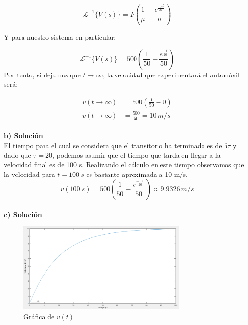 \documentclass[12pt, letterpaper]{article}
\begin{document}
\begin{equation}	
		\mathscr{L}^{-1} \{V(s)\} = F \left( \frac{1}{\mu} - \frac{e^{\frac{-\mu t}{M}}}{\mu}\right)
\end{equation}

Y para nuestro sistema en particular:

\begin{equation}	
		\mathscr{L}^{-1} \{V(s)\} = 500 \left( \frac{1}{50} - \frac{e^{\frac{-t}{20}}}{50}\right)
\end{equation}
Por tanto, si dejamos que $t \rightarrow \infty$, la velocidad que experimentará el automóvil será:

\begin{equation}
	\boxed{\begin{split}
		v(t \rightarrow \infty) &= 500 \left( \frac{1}{50} - 0\right)\\
		v(t \rightarrow \infty) & = \frac{500}{50} = 10\ m/s
	\end{split}}
\end{equation}\\
\textbf{b) Solución}\\
El tiempo para el cual se considera que el transitorio ha terminado es de $5\tau$ y dado que $\tau = 20$, podemos asumir que el tiempo que tarda en llegar a la velocidad final es de 100 s. Realizando el cálculo en este tiempo observamos que la velocidad para $t = 100\ s$ es bastante aproximada a 10 m/s.
\begin{equation}
	v(100\ s) = 500 \left( \frac{1}{50} - \frac{e^{\frac{-100}{20}}}{50}\right) \approx 9.9326\ m/s
\end{equation}\\
\textbf{c) Solución}\\


\begin{figure}[H]
	\centering
	\includegraphics[width=0.75\textwidth]{plot.png}
	\caption{Gráfica de $v(t)$}
\end{figure}
\renewcommand\refname{Referencias}
\printbibliography
\end{document}
